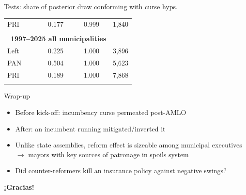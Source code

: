 \documentclass[bigger]{beamer}
\begin{document}
\begin{frame}[label={sec:orgd3ca57a}]{Tests: share of posterior draw conforming with curse hyps.}
\begin{tabular}{lccr}
PRI               &                    0.177                    &         0.999         & 1,840 \\ \\[-1.5ex]
\multicolumn{3}{l}{~\textbf{1997--2025 all municipalities}} \\
Left              &                    0.225                    &         1.000         & 3,896 \\
PAN               &                    0.504                    &         1.000         & 5,623 \\
PRI               &                    0.189                    &         1.000         & 7,868 \\[-1.5ex] \\ \hline
  \end{tabular}
\end{frame}
\begin{frame}[label={sec:orge15cfc6}]{Wrap-up}
\begin{itemize}
\item Before kick-off: incumbency curse permeated post-AMLO
\item After: an incumbent running mitigated/inverted it
\item Unlike state assemblies, reform effect is sizeable among municipal executives \newline \(\rightarrow\) mayors with key sources of patronage in spoils system
\item Did counter-reformers kill an insurance policy against negative swings?
\end{itemize}

\centering \bigskip \pause

\textbf{¡Gracias!}
\end{frame}
\end{document}
